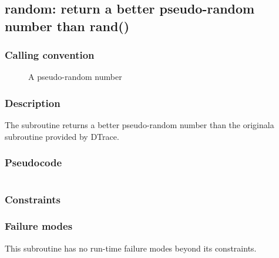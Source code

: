 \clearpage
{}
{}
\label{subr:random}
\subsection*{random: return a better pseudo-random number than rand()}

\subsubsection*{Calling convention}

\begin{description}
\item[] A pseudo-random number
\end{description}

\subsubsection*{Description}

The  subroutine returns a better pseudo-random
number than the originala  subroutine provided by DTrace.
\subsubsection*{Pseudocode}

\begin{verbatim}
\end{verbatim}

\subsubsection*{Constraints}

\subsubsection*{Failure modes}

This subroutine has no run-time failure modes beyond its constraints.
